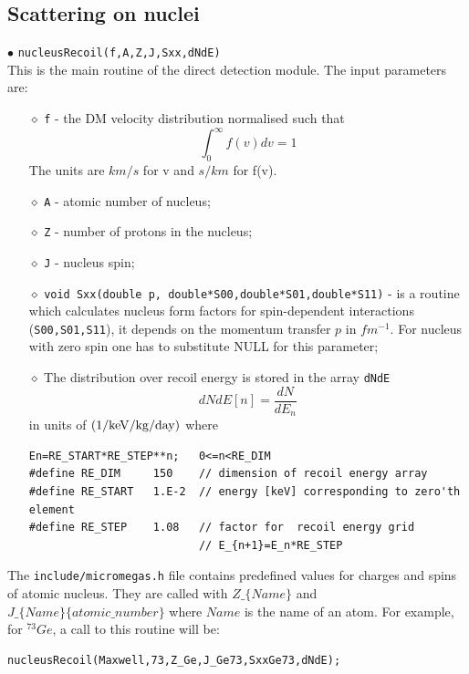 \documentclass[12pt,a4paper]{article}
\begin{document}
\subsection{Scattering on nuclei}
\label{DDforNucleus}
$\bullet$ \verb|nucleusRecoil(f,A,Z,J,Sxx,dNdE)|\\
This is the main routine of the  direct detection module. The
input parameters are:
\begin{itemize}
\item[$\diamond$]
\verb|f| -  the DM velocity distribution   normalised such that 
\begin{equation}
\label{v_norm} 
\int_0^{\infty} f(v) dv =1
\end{equation} 
The units  are $km/s$ for v and $s/km$ for  f(v).
\item[$\diamond$]
\verb|A| - atomic number of nucleus;
\item[$\diamond$]
\verb|Z| - number of protons in the nucleus;%
\item[$\diamond$]
\verb|J| - nucleus spin;%
\item[$\diamond$]
\verb|void Sxx(double p, double*S00,double*S01,double*S11)| - is a routine which calculates nucleus form factors for
spin-dependent interactions (\verb|S00,S01,S11|), it depends  on the momentum
transfer $p$  in $fm^{-1}$. For nucleus with zero spin one has to substitute NULL for this parameter;

\item[$\diamond$] The distribution over recoil energy is stored in the array 
\verb|dNdE| 
$$
   dNdE[n] = \frac{dN}{dE_n}
$$
in units of ${\rm (1/keV/kg/day)}$ where 
\begin{verbatim}
En=RE_START*RE_STEP**n;   0<=n<RE_DIM
#define RE_DIM     150    // dimension of recoil energy array
#define RE_START   1.E-2  // energy [keV] corresponding to zero'th element 
#define RE_STEP    1.08   // factor for  recoil energy grid  
                          // E_{n+1}=E_n*RE_STEP 
\end{verbatim}

\end{itemize}


 The \verb|include/micromegas.h| file contains  predefined values for charges
and spins of atomic nucleus. They are called with $Z\_\{Name\}$ and $J\_\{Name\}\{atomic\_number\}$ where
$Name$ is the name of an atom.   For example, for $^{73}Ge$, a call to this routine will be: 
\begin{verbatim}
nucleusRecoil(Maxwell,73,Z_Ge,J_Ge73,SxxGe73,dNdE);
\end{verbatim}
\end{document}
